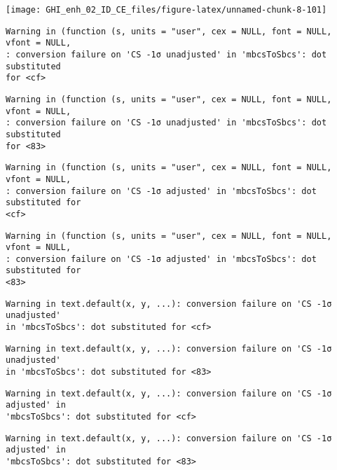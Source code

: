 \documentclass[
  10pt,
  a4paper,oneside]{article}
\begin{document}
\begin{center}\texttt{[image: GHI\_enh\_02\_ID\_CE\_files/figure-latex/unnamed-chunk-8-101]} \end{center}

\begin{verbatim}
Warning in (function (s, units = "user", cex = NULL, font = NULL, vfont = NULL,
: conversion failure on 'CS -1σ unadjusted' in 'mbcsToSbcs': dot substituted
for <cf>
\end{verbatim}

\begin{verbatim}
Warning in (function (s, units = "user", cex = NULL, font = NULL, vfont = NULL,
: conversion failure on 'CS -1σ unadjusted' in 'mbcsToSbcs': dot substituted
for <83>
\end{verbatim}

\begin{verbatim}
Warning in (function (s, units = "user", cex = NULL, font = NULL, vfont = NULL,
: conversion failure on 'CS -1σ adjusted' in 'mbcsToSbcs': dot substituted for
<cf>
\end{verbatim}

\begin{verbatim}
Warning in (function (s, units = "user", cex = NULL, font = NULL, vfont = NULL,
: conversion failure on 'CS -1σ adjusted' in 'mbcsToSbcs': dot substituted for
<83>
\end{verbatim}

\begin{verbatim}
Warning in text.default(x, y, ...): conversion failure on 'CS -1σ unadjusted'
in 'mbcsToSbcs': dot substituted for <cf>
\end{verbatim}

\begin{verbatim}
Warning in text.default(x, y, ...): conversion failure on 'CS -1σ unadjusted'
in 'mbcsToSbcs': dot substituted for <83>
\end{verbatim}

\begin{verbatim}
Warning in text.default(x, y, ...): conversion failure on 'CS -1σ adjusted' in
'mbcsToSbcs': dot substituted for <cf>
\end{verbatim}

\begin{verbatim}
Warning in text.default(x, y, ...): conversion failure on 'CS -1σ adjusted' in
'mbcsToSbcs': dot substituted for <83>
\end{verbatim}
\end{document}
